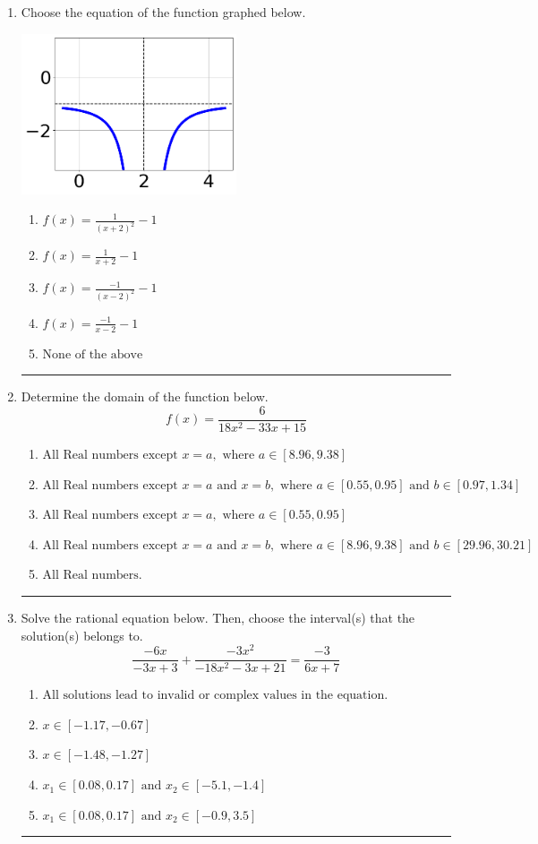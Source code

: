 \documentclass[14pt]{extbook}
\newcommand{\litem}[1]{\item#1\hspace*{-1cm}\rule{\textwidth}{0.4pt}}
\begin{document}
\begin{enumerate}
\litem{
Choose the equation of the function graphed below.
\begin{center}
    \includegraphics[width=0.5\textwidth]{../Figures/rationalGraphToEquationB.png}
\end{center}
\begin{enumerate}[label=\Alph*.]
\item \( f(x) = \frac{1}{(x + 2)^2} - 1 \)
\item \( f(x) = \frac{1}{x + 2} - 1 \)
\item \( f(x) = \frac{-1}{(x - 2)^2} - 1 \)
\item \( f(x) = \frac{-1}{x - 2} - 1 \)
\item \( \text{None of the above} \)

\end{enumerate} }
\litem{
Determine the domain of the function below.\[ f(x) = \frac{6}{18x^{2} -33 x + 15} \]\begin{enumerate}[label=\Alph*.]
\item \( \text{All Real numbers except } x = a, \text{ where } a \in [8.96, 9.38] \)
\item \( \text{All Real numbers except } x = a \text{ and } x = b, \text{ where } a \in [0.55, 0.95] \text{ and } b \in [0.97, 1.34] \)
\item \( \text{All Real numbers except } x = a, \text{ where } a \in [0.55, 0.95] \)
\item \( \text{All Real numbers except } x = a \text{ and } x = b, \text{ where } a \in [8.96, 9.38] \text{ and } b \in [29.96, 30.21] \)
\item \( \text{All Real numbers.} \)

\end{enumerate} }
\litem{
Solve the rational equation below. Then, choose the interval(s) that the solution(s) belongs to.\[ \frac{-6x}{-3x + 3} + \frac{-3x^{2}}{-18x^{2} -3 x + 21} = \frac{-3}{6x + 7} \]\begin{enumerate}[label=\Alph*.]
\item \( \text{All solutions lead to invalid or complex values in the equation.} \)
\item \( x \in [-1.17,-0.67] \)
\item \( x \in [-1.48,-1.27] \)
\item \( x_1 \in [0.08, 0.17] \text{ and } x_2 \in [-5.1,-1.4] \)
\item \( x_1 \in [0.08, 0.17] \text{ and } x_2 \in [-0.9,3.5] \)


\end{enumerate}}
\end{enumerate}
\end{document}

